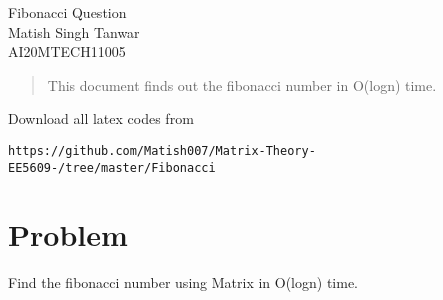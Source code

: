 \documentclass[journal,12pt,twocolumn]{IEEEtran}
\begin{document}
\begin{center}
\huge Fibonacci Question\\

\large Matish Singh Tanwar\\
\large AI20MTECH11005\\
\end{center}
\vspace{1.0cm}
\begin{abstract}
This document finds out the fibonacci number in O(logn) time.
\end{abstract}
\vspace{0.5cm}
Download all latex codes from
\begin{lstlisting}
https://github.com/Matish007/Matrix-Theory-EE5609-/tree/master/Fibonacci
\end{lstlisting}
%
\vspace{0.5mm}
\section{Problem}
Find the fibonacci number using Matrix in O(logn) time.
\end{document}
